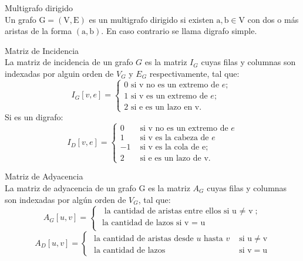 \documentclass{article}
\begin{document}
\begin{defn}
Multigrafo dirigido \\ Un grafo $\mathrm{G}=(\mathrm{V}, \mathrm{E})$ es un multigrafo dirigido si existen $\mathrm{a}, \mathrm{b} \in \mathrm{V}$ con dos o más aristas de la forma $(\mathrm{a}, \mathrm{b})$. En caso contrario se llama digrafo simple.
\end{defn}

\begin{defn}
Matriz de Incidencia \\ La matriz de incidencia de un grafo $G$ es la matriz $I_{G}$ cuyas filas y columnas son indexadas por alguin orden de $V_{G}$ y $E_{G}$ respectivamente, tal que:
$$I_{G}[v, e]=\left\{\begin{array}{l}0 \text { si v no es un extremo de } e \text {; } \\ 1 \text { si v es un extremo de } e \text {; } \\ 2 \text { si e es un lazo en v. }\end{array}\right.$$ Si es un digrafo:
$$I_{D}[v, e]=\left\{\begin{array}{ll}0 & \text { si } \mathrm{v} \text { no es un extremo de } e \\ 1 & \text { si } \mathrm{v} \text { es la cabeza de } e \\ -1 & \text { si } \mathrm{v} \text { es la cola de } \mathrm{e} ; \\ 2 & \text { si e es un lazo de } \mathrm{v} .\end{array}\right.$$
\end{defn}

\begin{defn}
Matriz de Adyacencia \\ La matriz de adyacencia de un grafo $\mathrm{G}$ es la matriz $A_{G}$ cuyas filas y columnas son indexadas por algún orden de $V_{G}$, tal que:
$$A_{G}[u, v]=\left\{\begin{array}{l}\text { la cantidad de aristas entre ellos si u $\neq$ v} ; \\ \text { la cantidad de lazos si v = u} \\ \end{array}\right.$$
$$A_{D}[u, v]=\left\{\begin{array}{ll}\text { la cantidad de aristas desde } u \text { hasta } v & \text { si } \mathrm{u} \neq \mathrm{v} \\ \text { la cantidad de lazos } & \text { si } \mathrm{v}=\mathrm{u}\end{array}\right.$$
\end{defn}
\end{document}
